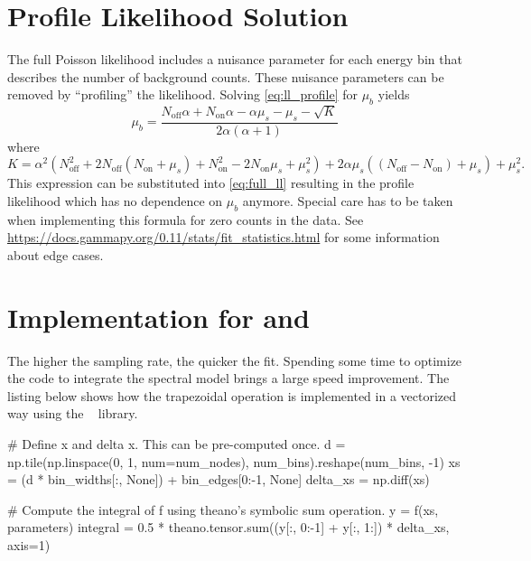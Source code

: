 \section{Profile Likelihood Solution}
\label{ap:wstat}
The full Poisson likelihood includes a nuisance parameter for each energy bin that describes the number of background counts.
These nuisance parameters can be removed by \enquote{profiling} the likelihood.
Solving \eqref{eq:ll_profile} for $\mu_b$ yields
\begin{equation}
  \mu_b =\frac{N_{\mathrm{off}}\alpha + N_{\mathrm{on}}\alpha - \alpha\mu_s - \mu_s - \sqrt{K}}{2\alpha(\alpha + 1)}
\end{equation}
where
\begin{equation*}
  K = \alpha^2 (N_{\mathrm{off}}^2 +  2 N_{\mathrm{off}} (N_{\mathrm{on}} + \mu_s) + N_{\mathrm{on}}^2 - 2 N_{\mathrm{on}} \mu_s + \mu_s^2) + 2 \alpha \mu_s ((N_{\mathrm{off}} - N_{\mathrm{on}}) + \mu_s) + \mu_s^2.
\end{equation*}
This expression can be substituted into \eqref{eq:full_ll} resulting in the profile likelihood which has no dependence on $\mu_b$ anymore.
Special care has to be taken when implementing this formula for zero counts in the data. 
See \url{https://docs.gammapy.org/0.11/stats/fit_statistics.html} for some information about edge cases.


\newpage
\section{Implementation for \pymc and \theano}
\label{ap:sampler_details}
The higher the sampling rate, the quicker the fit. Spending some time to optimize the code to integrate the spectral model brings a large speed improvement.
The listing below shows how the trapezoidal operation is implemented in a vectorized way using the \numpy~\cite{numpy} library.

\begin{minipage}{\textwidth}
\begin{mdframed}[backgroundcolor=white!20!black,leftmargin=0cm,rightmargin=0cm, skipabove=0pt, innerleftmargin=0,innerrightmargin=0,]
\begin{pythonlst}[basicstyle=\lstsansserif]
  # Define x and delta x. This can be pre-computed once.
  d = np.tile(np.linspace(0, 1, num=num_nodes), num_bins).reshape(num_bins, -1) 
  xs = (d * bin_widths[:, None]) + bin_edges[0:-1, None] 
  delta_xs = np.diff(xs)

  # Compute the integral of f using theano's symbolic sum operation. 
  y = f(xs, parameters)
  integral = 0.5 * theano.tensor.sum((y[:, 0:-1] + y[:, 1:]) * delta_xs, axis=1) 
\end{pythonlst}
\end{mdframed}
\end{minipage}

